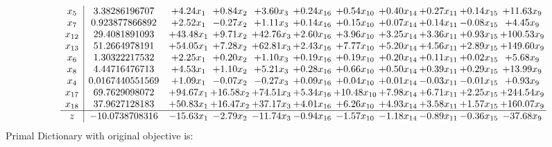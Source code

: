 \documentclass[9pt]{article}
\begin{document}
\[\begin{array}{c| c c@{\hskip 2pt} c@{\hskip 2pt} c@{\hskip 2pt} c@{\hskip 2pt} c@{\hskip 2pt} c@{\hskip 2pt} c@{\hskip 2pt} c@{\hskip 2pt} c@{\hskip 2pt} }
 x_{5}   &  3.38286196707 & +  4.24 x_{1} & +  0.84 x_{2} & +  3.60 x_{3} & +  0.24 x_{16} & +  0.54 x_{10} & +  0.40 x_{14} & +  0.27 x_{11} & +  0.14 x_{15} & + 11.63 x_{9}\\
 x_{7}   &  0.923877866892 & +  2.52 x_{1} & -0.27 x_{2} & +  1.11 x_{3} & +  0.14 x_{16} & +  0.15 x_{10} & +  0.07 x_{14} & +  0.14 x_{11} & -0.08 x_{15} & +  4.45 x_{9}\\
 x_{12}   &  29.4081891093 & + 43.48 x_{1} & +  9.71 x_{2} & + 42.76 x_{3} & +  2.60 x_{16} & +  3.96 x_{10} & +  3.25 x_{14} & +  3.36 x_{11} & +  0.93 x_{15} & + 100.53 x_{9}\\
 x_{13}   &  51.2664978191 & + 54.05 x_{1} & +  7.28 x_{2} & + 62.81 x_{3} & +  2.43 x_{16} & +  7.77 x_{10} & +  5.20 x_{14} & +  4.56 x_{11} & +  2.89 x_{15} & + 149.60 x_{9}\\
 x_{6}   &  1.30322217532 & +  2.25 x_{1} & +  0.20 x_{2} & +  1.10 x_{3} & +  0.19 x_{16} & +  0.19 x_{10} & +  0.20 x_{14} & +  0.11 x_{11} & +  0.02 x_{15} & +  5.68 x_{9}\\
 x_{8}   &  4.44716476713 & +  4.53 x_{1} & +  1.10 x_{2} & +  5.21 x_{3} & +  0.28 x_{16} & +  0.66 x_{10} & +  0.50 x_{14} & +  0.39 x_{11} & +  0.29 x_{15} & + 13.99 x_{9}\\
 x_{4}   &  0.0167440551569 & +  1.09 x_{1} & -0.07 x_{2} & -0.27 x_{3} & +  0.09 x_{16} & +  0.04 x_{10} & +  0.01 x_{14} & -0.03 x_{11} & -0.01 x_{15} & +  0.93 x_{9}\\
 x_{17}   &  69.7629098072 & + 94.67 x_{1} & + 16.58 x_{2} & + 74.51 x_{3} & +  5.34 x_{16} & + 10.48 x_{10} & +  7.98 x_{14} & +  6.71 x_{11} & +  2.25 x_{15} & + 244.54 x_{9}\\
 x_{18}   &  37.9627128183 & + 50.83 x_{1} & + 16.47 x_{2} & + 37.17 x_{3} & +  4.01 x_{16} & +  6.26 x_{10} & +  4.93 x_{14} & +  3.58 x_{11} & +  1.57 x_{15} & + 160.07 x_{9}\\
\hline
z    &  -10.0738708316 & -15.63 x_{1} & -2.79 x_{2} & -11.74 x_{3} & -0.94 x_{16} & -1.57 x_{10} & -1.18 x_{14} & -0.89 x_{11} & -0.36 x_{15} & -37.68 x_{9}\\
\end{array}\]
Primal Dictionary with original objective is:
\end{document}
